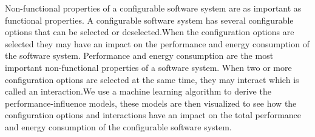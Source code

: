 Non-functional properties of a configurable software system are as important as functional properties. A configurable software system has several configurable options that can be selected or deselected.When the configuration options are selected they may have an impact on the performance and energy consumption of the software system. Performance and energy consumption are the most important non-functional properties of a software system. When two or more configuration options are selected at the same time, they may interact which is called an interaction.We use a machine learning algorithm to derive the performance-influence models, these models are then visualized to see how the configuration options and interactions have an impact on the total performance and energy consumption of the configurable software system.